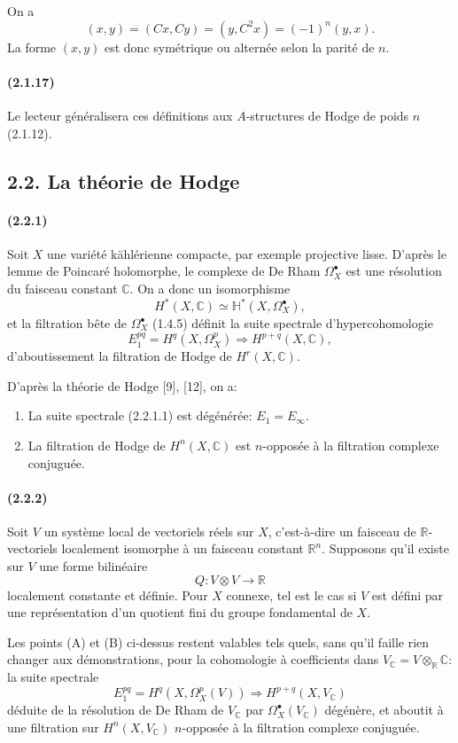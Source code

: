 \documentclass[10pt]{article}
\newcommand{\C}{\mathbb C}
\newcommand{\R}{\mathbb R}
\begin{document}
On a
\[
(x,y)=(Cx,Cy)=(y,C^2x)=(-1)^n(y,x).
\]
La forme $(x,y)$ est donc symétrique ou alternée selon la parité de $n$.

\paragraph{(2.1.17)} Le lecteur généralisera ces définitions aux $A$-structures de Hodge de poids $n$ (2.1.12).

\subsection*{2.2. La théorie de Hodge}

\paragraph{(2.2.1)} Soit $X$ une variété kählérienne compacte, par exemple projective lisse. D'après le lemme de Poincaré holomorphe, le complexe de De Rham $\Omega_X^\bullet$ est une résolution du faisceau constant $\C$. On a donc un isomorphisme
\[
H^*(X,\C)\simeq\mathbb H^*(X,\Omega_X^\bullet),
\]
et la filtration bête de $\Omega_X^\bullet$ (1.4.5) définit la suite spectrale d'hypercohomologie
\[
\tag{2.2.1.1}
E_1^{pq}=H^q(X,\Omega_X^p)\Longrightarrow H^{p+q}(X,\C),
\]
d'aboutissement la filtration de Hodge de $H^r(X,\C)$.

D'après la théorie de Hodge [9], [12], on a:
\begin{enumerate}[label=(\Alph*)]
\item La suite spectrale (2.2.1.1) est dégénérée: $E_1=E_\infty$.
\item La filtration de Hodge de $H^n(X,\C)$ est $n$-opposée à la filtration complexe conjuguée.
\end{enumerate}

\paragraph{(2.2.2)} Soit $V$ un système local de vectoriels réels sur $X$, c'est-à-dire un faisceau de $\R$-vectoriels localement isomorphe à un faisceau constant $\R^n$. Supposons qu'il existe sur $V$ une forme bilinéaire
\[
Q:V\otimes V\longrightarrow\R
\]
localement constante et définie. Pour $X$ connexe, tel est le cas si $V$ est défini par une représentation d'un quotient fini du groupe fondamental de $X$.

Les points (A) et (B) ci-dessus restent valables tels quels, sans qu'il faille rien changer aux démonstrations, pour la cohomologie à coefficients dans $V_\C=V\otimes_\R\C$: la suite spectrale
\[
E_1^{pq}=H^q(X,\Omega_X^p(V))\Longrightarrow H^{p+q}(X,V_\C)
\]
déduite de la résolution de De Rham de $V_\C$ par $\Omega_X^\bullet(V_\C)$ dégénère, et aboutit à une filtration sur $H^n(X,V_\C)$ $n$-opposée à la filtration complexe conjuguée.
\end{document}
